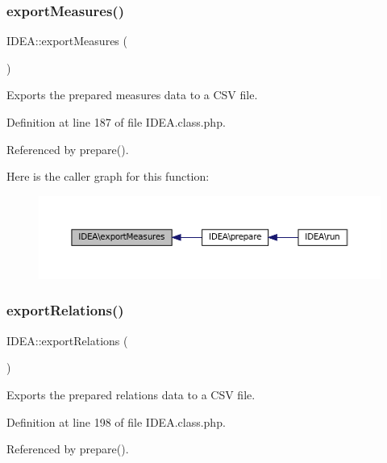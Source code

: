\subsubsection{\texorpdfstring{export\+Measures()}{exportMeasures()}}
{\footnotesize\ttfamily I\+D\+E\+A\+::export\+Measures (\begin{DoxyParamCaption}{ }\end{DoxyParamCaption})\hspace{0.3cm}{\ttfamily [protected]}}

Exports the prepared measures data to a C\+SV file. 

Definition at line 187 of file I\+D\+E\+A.\+class.\+php.



Referenced by prepare().

Here is the caller graph for this function\+:\nopagebreak
\begin{figure}[H]
\begin{center}
\leavevmode
\includegraphics[width=350pt]{class_i_d_e_a_ab64af10966c41b17649bfc1e9ac1fad5_icgraph}
\end{center}
\end{figure}
\mbox{\label{class_i_d_e_a_a4bb32a8d3fd43d598db825f0e8dd556d}} 
\subsubsection{\texorpdfstring{export\+Relations()}{exportRelations()}}
{\footnotesize\ttfamily I\+D\+E\+A\+::export\+Relations (\begin{DoxyParamCaption}{ }\end{DoxyParamCaption})\hspace{0.3cm}{\ttfamily [protected]}}

Exports the prepared relations data to a C\+SV file. 

Definition at line 198 of file I\+D\+E\+A.\+class.\+php.



Referenced by prepare().

